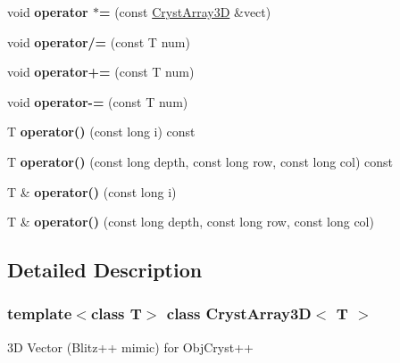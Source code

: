\begin{DoxyCompactItemize}
\mbox{\label{class_cryst_array3_d_a30b9e9a59753e28f983e5dc3cafb7ec1}} 
void {\bfseries operator $\ast$=} (const \mbox{\hyperlink{class_cryst_array3_d}{Cryst\+Array3D}} \&vect)
\item 
\mbox{\label{class_cryst_array3_d_ae09d581b3bd395eef7bc5a3d0fe358d8}} 
void {\bfseries operator/=} (const T num)
\item 
\mbox{\label{class_cryst_array3_d_a4c3a4526fc22e48a1794811b795b025e}} 
void {\bfseries operator+=} (const T num)
\item 
\mbox{\label{class_cryst_array3_d_adcebc860353f85fa88001a5e12fc9d09}} 
void {\bfseries operator-\/=} (const T num)
\item 
\mbox{\label{class_cryst_array3_d_a5d1a07df466e499ef717a8e06856366e}} 
T {\bfseries operator()} (const long i) const
\item 
\mbox{\label{class_cryst_array3_d_a839d8331533ae972081f92e6721de665}} 
T {\bfseries operator()} (const long depth, const long row, const long col) const
\item 
\mbox{\label{class_cryst_array3_d_a3493a3f381a8b703ce00bd0b569d86e8}} 
T \& {\bfseries operator()} (const long i)
\item 
\mbox{\label{class_cryst_array3_d_a18223f585c9c9f65ed6b80d1d78f58da}} 
T \& {\bfseries operator()} (const long depth, const long row, const long col)
\end{DoxyCompactItemize}


\subsection{Detailed Description}
\subsubsection*{template$<$class T$>$\newline
class Cryst\+Array3\+D$<$ T $>$}

3D Vector (Blitz++ mimic) for Obj\+Cryst++ 

